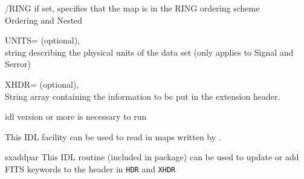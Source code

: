 \begin{keywords}
\begin{kwlist}{}
	\item[{/RING}] if set, specifies that the map is in the RING ordering
	scheme\\
	\seealso Ordering and Nested

	\item[{UNITS=}]
		(optional), \\
		string describing the physical units of the data set (only applies
		to Signal and Serror)

    	\item[XHDR=] 	
		(optional), \\
		String array containing the information to be put in
		the extension header. 

   \end{kwlist}
\end{keywords}

\begin{codedescription}

\end{codedescription}



\begin{related}
  \begin{sulist}{} %
  \item[idl] version \idlversion or more is necessary to run \thedocid
  \item[\htmlref{read\_fits\_cut4}{idl:read_fits_cut4}] This \healpix IDL facility can be used to read in maps
  written by \thedocid.

  \item[sxaddpar] This IDL routine (included in \healpix package) can be used to update
  or add FITS keywords to the header in {\tt HDR} and {\tt XHDR}
  \end{sulist}
\end{related}


